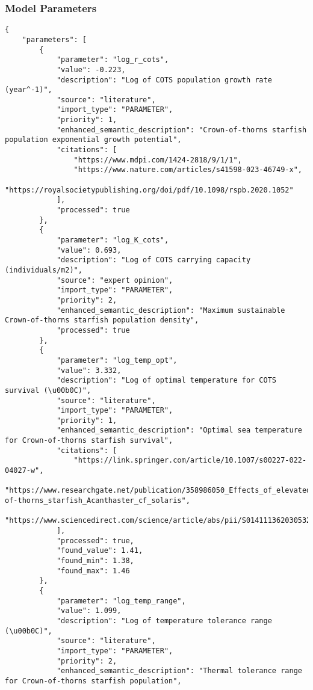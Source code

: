 \subsubsection{Model Parameters}
\begin{lstlisting}
{
    "parameters": [
        {
            "parameter": "log_r_cots",
            "value": -0.223,
            "description": "Log of COTS population growth rate (year^-1)",
            "source": "literature",
            "import_type": "PARAMETER",
            "priority": 1,
            "enhanced_semantic_description": "Crown-of-thorns starfish population exponential growth potential",
            "citations": [
                "https://www.mdpi.com/1424-2818/9/1/1",
                "https://www.nature.com/articles/s41598-023-46749-x",
                "https://royalsocietypublishing.org/doi/pdf/10.1098/rspb.2020.1052"
            ],
            "processed": true
        },
        {
            "parameter": "log_K_cots",
            "value": 0.693,
            "description": "Log of COTS carrying capacity (individuals/m2)",
            "source": "expert opinion",
            "import_type": "PARAMETER",
            "priority": 2,
            "enhanced_semantic_description": "Maximum sustainable Crown-of-thorns starfish population density",
            "processed": true
        },
        {
            "parameter": "log_temp_opt",
            "value": 3.332,
            "description": "Log of optimal temperature for COTS survival (\u00b0C)",
            "source": "literature",
            "import_type": "PARAMETER",
            "priority": 1,
            "enhanced_semantic_description": "Optimal sea temperature for Crown-of-thorns starfish survival",
            "citations": [
                "https://link.springer.com/article/10.1007/s00227-022-04027-w",
                "https://www.researchgate.net/publication/358986050_Effects_of_elevated_temperature_on_the_performance_and_survival_of_pacific_crown-of-thorns_starfish_Acanthaster_cf_solaris",
                "https://www.sciencedirect.com/science/article/abs/pii/S0141113620305328"
            ],
            "processed": true,
            "found_value": 1.41,
            "found_min": 1.38,
            "found_max": 1.46
        },
        {
            "parameter": "log_temp_range",
            "value": 1.099,
            "description": "Log of temperature tolerance range (\u00b0C)",
            "source": "literature",
            "import_type": "PARAMETER",
            "priority": 2,
            "enhanced_semantic_description": "Thermal tolerance range for Crown-of-thorns starfish population",

\end{lstlisting}
